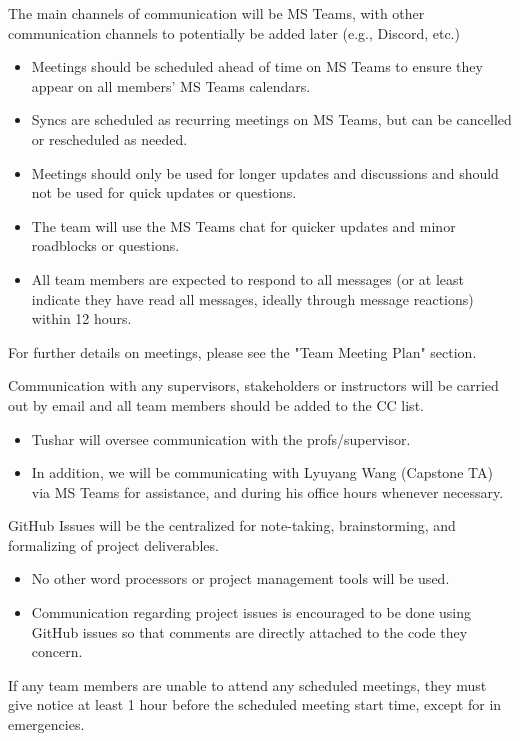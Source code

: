 \documentclass{article}
\begin{document}
\begin{itemize}
\begin{item}
The main channels of communication will be MS Teams, with other communication channels to potentially be added later (e.g., Discord, etc.)
\begin{itemize}
\item Meetings should be scheduled ahead of time on MS Teams to ensure they appear on all members' MS Teams calendars.
\item Syncs are scheduled as recurring meetings on MS Teams, but can be cancelled or rescheduled as needed.
\item Meetings should only be used for longer updates and discussions and should not be used for quick updates or questions.
\item The team will use the MS Teams chat for quicker updates and minor roadblocks or questions.
\item All team members are expected to respond to all messages (or at least indicate they have read all messages, ideally through message reactions) within 12 hours.
\end{itemize}
\end{item}
\end{itemize}

For further details on meetings, please see the "Team Meeting Plan" section.

\begin{itemize}
\begin{item}
Communication with any supervisors, stakeholders or instructors will be carried out by email and all team members should be added to the CC list.
\begin{itemize}
\item Tushar will oversee communication with the profs/supervisor.
\item In addition, we will be communicating with Lyuyang Wang (Capstone TA) via MS Teams for assistance, and during his office hours whenever necessary.
\end{itemize}
\end{item}
\begin{item}
GitHub Issues will be the centralized for note-taking, brainstorming, and formalizing of project deliverables.
\begin{itemize}
\item No other word processors or project management tools will be used.
\item Communication regarding project issues is encouraged to be done using GitHub issues so that comments are directly attached to the code they concern.
\end{itemize}
\end{item}
\begin{item}
If any team members are unable to attend any scheduled meetings, they must give notice at least 1 hour before the scheduled meeting start time, except for in emergencies.
\end{item}
\end{itemize}
\end{document}
